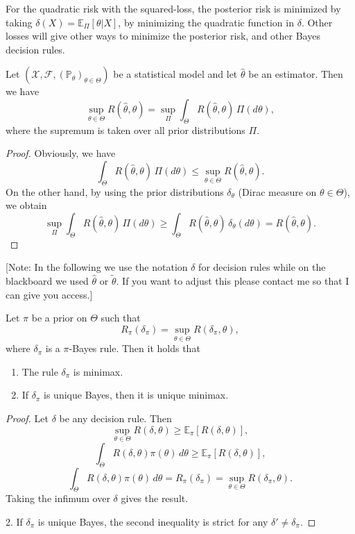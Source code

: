 \documentclass[open=any, 11pt,paper=A4]{scrreprt}
\begin{document}
\begin{example}
    For the quadratic risk with the squared-loss, the posterior risk is minimized by taking $\delta(X) = \mathbb{E}_{\Pi}[\theta | X]$, by minimizing the quadratic function in $\delta$. Other losses will give other ways to minimize the posterior risk, and other Bayes decision rules.
\end{example}

\begin{proposition}
Let \((\mathcal{X}, \mathcal{F}, (\mathbb{P}_{\theta})_{\theta \in \Theta})\) be a statistical model and let \(\hat{\theta}\) be an estimator. Then we have
\[
\sup_{\theta \in \Theta} R(\hat{\theta}, \theta) = \sup_{\Pi} \int_{\Theta} R(\hat{\theta}, \theta) \, \Pi(d\theta),
\]
where the supremum is taken over all prior distributions \(\Pi\).
\end{proposition}

\begin{proof}
Obviously, we have 
\[
\int_{\Theta} R(\hat{\theta}, \theta) \, \Pi(d\theta) \leq \sup_{\theta \in \Theta} R(\hat{\theta}, \theta).
\]
On the other hand, by using the prior distributions \(\delta_{\theta}\) (Dirac measure on \(\theta \in \Theta\)), we obtain
\[
\sup_{\Pi} \int_{\Theta} R(\hat{\theta}, \theta) \, \Pi(d\theta) \geq \int_{\Theta} R(\hat{\theta}, \theta) \, \delta_{\theta}(d\theta) = R(\hat{\theta}, \theta).
\]
\end{proof}

[Note: In the following we use the notation $\delta$ for decision rules while on the blackboard we used $\hat{\theta}$ or $\tilde{\theta}$. If you want to adjust this please contact me so that I can give you access.]

\begin{proposition}
Let \(\pi\) be a prior on \(\Theta\) such that
\[
R_{\pi}(\delta_{\pi}) = \sup_{\theta \in \Theta} R(\delta_{\pi}, \theta),
\]
where \(\delta_{\pi}\) is a \(\pi\)-Bayes rule. Then it holds that
\begin{enumerate}
    \item The rule \(\delta_{\pi}\) is minimax.
    \item If \(\delta_{\pi}\) is unique Bayes, then it is unique minimax.
\end{enumerate}
\end{proposition}

\begin{proof} Let \(\delta\) be any decision rule. Then
\[
\sup_{\theta \in \Theta} R(\delta, \theta) \geq \mathbb{E}_{\pi}[R(\delta, \theta)],
\]
\[
\int_{\Theta} R(\delta, \theta) \pi(\theta) \, d\theta \geq \mathbb{E}_{\pi}[R(\delta, \theta)],
\]
\[
\int_{\Theta} R(\delta, \theta) \pi(\theta) \, d\theta = R_{\pi}(\delta_{\pi}) = \sup_{\theta \in \Theta} R(\delta_{\pi}, \theta).
\]
Taking the infimum over \(\delta\) gives the result.

2. If \(\delta_{\pi}\) is unique Bayes, the second inequality is strict for any \(\delta' \neq \delta_{\pi}\).
\end{proof}
\end{document}
